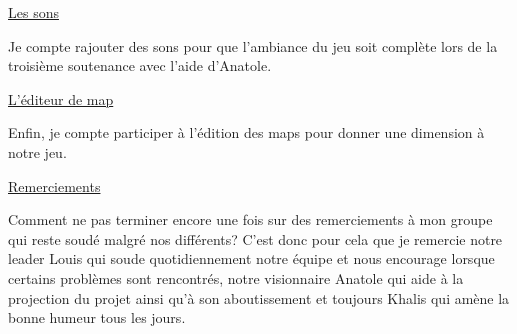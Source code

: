 \documentclass{article}
\begin{document}
\par
\underline{Les sons}
\newline
\par
Je compte rajouter des sons pour que l'ambiance du jeu soit complète lors de la troisième soutenance avec l’aide d’Anatole.
\newline

\par
\underline{L'éditeur de map}
\newline
\par
Enfin, je compte participer à l'édition des maps pour donner une dimension à notre jeu.
\newline

\par
\underline{Remerciements}
\newline
\par
Comment ne pas terminer encore une fois sur des remerciements à mon groupe qui reste soudé malgré nos différents? C'est donc pour cela que je remercie notre leader Louis qui soude quotidiennement notre équipe et nous encourage lorsque certains problèmes sont rencontrés, notre visionnaire Anatole qui aide à la projection du projet ainsi qu'à son aboutissement et toujours Khalis qui amène la bonne humeur tous les jours.

\newpage
\end{document}
